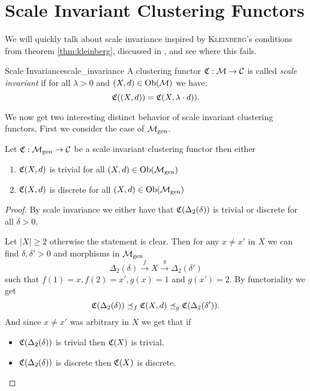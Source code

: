 \section{Scale Invariant Clustering Functors}

We will quickly talk about scale invariance inspired by \textsc{Kleinberg}'s conditions from theorem \ref{thm:kleinberg}, discussed in \cite[Sec.~6.6]{Carlsson2010}, and see where this fails.

\begin{definition}{Scale Invariance}{scale_invariance}
    A clustering functor $\mathfrak{C}: \mathcal{M} \to \mathcal{C}$ is called \emph{scale invariant} if for all $\lambda > 0$ and $(X,d) \in \mathrm {Ob}(\mathcal{M})$ we have:
    \begin{equation*}
        \mathfrak{C}((X,d)) = \mathfrak{C}(X,\lambda \cdot d)).
    \end{equation*}
\end{definition}

We now get two interesting distinct behavior of scale invariant clustering functors. First we consider the case of ${\mathcal{M}_\mathrm{gen}}$.

\begin{proposition}{\cite[Thm.~6.5]{Carlsson2010}}{}
    Let $\mathfrak{C}: {\mathcal{M}_\mathrm{gen}} \to \mathcal{C}$ be a scale invariant clustering functor then either
    \begin{enumerate}
        \item $\mathfrak{C}(X,d)$ is trivial for all $(X,d) \in \mathrm {Ob}({\mathcal{M}_\mathrm{gen}})$
        \item $\mathfrak{C}(X,d)$ is discrete for all $(X,d) \in \mathrm {Ob}({\mathcal{M}_\mathrm{gen}})$
    \end{enumerate}
\end{proposition}

\begin{proof}
    By scale invariance we either have that $\mathfrak{C}(\Delta_2(\delta))$ is trivial or discrete for all $\delta > 0$.

    Let $|X| \ge 2$ otherwise the statement is clear. Then for any $x \neq x'$ in $X$ we can find $\delta, \delta' > 0$ and morphisms in ${\mathcal{M}_\mathrm{gen}}$
    $$
    \Delta_2(\delta) \overset{f}\longrightarrow X \overset{g}\longrightarrow \Delta_2(\delta')
    $$
    such that $f(1) = x, f(2) = x', g(x) = 1$ and $g(x') = 2$. By functoriality we get
    $$
    \mathfrak{C}(\Delta_2(\delta)) \preceq_f \mathfrak{C}(X,d) \preceq_g \mathfrak{C}(\Delta_2(\delta')).
    $$
    And since $x \neq x'$ was arbitrary in $X$ we get that if
    \begin{itemize}
        \item $\mathfrak{C}(\Delta_2(\delta))$ is trivial then $\mathfrak{C}(X)$ is trivial.
        \item $\mathfrak{C}(\Delta_2(\delta))$ is discrete then $\mathfrak{C}(X)$ is discrete.
    \end{itemize}
\end{proof}

